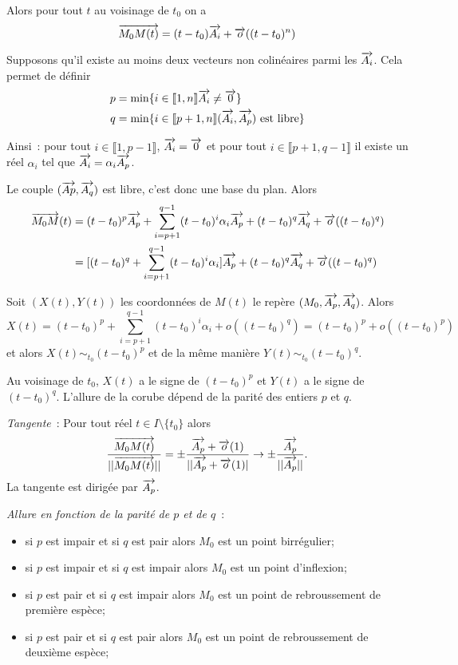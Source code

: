 Alors pour tout $t$ au voisinage de $t_0$ on a
\begin{equation}
  \overrightarrow{M_0M(t)} = (t-t_0)\overrightarrow{A_i} +\overrightarrow{o}((t-t_0)^n)
\end{equation}


Supposons qu'il existe au moins deux vecteurs non colinéaires parmi les $\overrightarrow{A_i}$. Cela permet de définir
\begin{align}
  p &= \min \{i \in \llbracket 1,n \rrbracket \overrightarrow{A_i} \neq \overrightarrow{0} \} \\
  q &= \min \{i \in \llbracket p+1,n \rrbracket (\overrightarrow{A_i},\overrightarrow{A_p}) \text{~est libre}\}
\end{align}

Ainsi~: pour tout $i \in \llbracket 1, p-1 \rrbracket$, $\overrightarrow{A_i}=\overrightarrow{0}$ et pour tout $i \in \llbracket p+1, q-1 \rrbracket$ il existe un réel $\alpha_i$ tel que $\overrightarrow{A_i}=\alpha_i \overrightarrow{A_p}$.

Le couple $(\overrightarrow{Ap}, \overrightarrow{A_q})$ est libre, c'est donc une base du plan. Alors
\begin{align}
  \overrightarrow{M_0M}(t) &= (t-t_0)^p \overrightarrow{A_p} + \sum_{i=p+1}^{q-1} (t-t_0)^i \alpha_i \overrightarrow{A_p} +(t-t_0)^q \overrightarrow{A_q} +\overrightarrow{o}((t-t_0)^q) \\
&=[(t-t_0)^q + \sum_{i=p+1}^{q-1} (t-t_0)^i \alpha_i]\overrightarrow{A_p} + (t-t_0)^q \overrightarrow{A_q} +\overrightarrow{o}((t-t_0)^q)
\end{align}

Soit $(X(t),Y(t))$ les coordonnées de $M(t)$ le repère $(M_0,\overrightarrow{A_p},\overrightarrow{A_q})$. Alors
\begin{equation}
  X(t) = (t-t_0)^p+\sum_{i=p+1}^{q-1} (t-t_0)^i \alpha_i + o((t-t_0)^q) = (t-t_0)^p + o((t-t_0)^p)
\end{equation}
et alors $X(t) \sim_{t_0} (t-t_0)^p$ et de la même manière $Y(t) \sim_{t_0}(t-t_0)^q$.

Au voisinage de $t_0$, $X(t)$ a le signe de $(t-t_0)^p$ et $Y(t)$ a le signe de $(t-t_0)^q$. L'allure de la corube dépend de la parité des entiers $p$ et $q$.

\emph{Tangente}~: Pour tout réel $t \in I\setminus\{t_0\}$ alors
\begin{equation}
  \frac{\overrightarrow{M_0M(t)}}{||\overrightarrow{M_0M(t)}||} = \pm \frac{\overrightarrow{A_p} +\overrightarrow{o}(1)}{||\overrightarrow{A_p} +\overrightarrow{o}(1)|} \to \pm \frac{\overrightarrow{A_p}}{||\overrightarrow{A_p}||}.
\end{equation}
La tangente est dirigée par $\overrightarrow{A_p}$.

\emph{Allure en fonction de la parité de $p$ et de $q$}~:
\begin{itemize}
\item si $p$ est impair et si $q$ est pair alors $M_0$ est un point birrégulier;
\item si $p$ est impair et si $q$ est impair alors $M_0$ est un point d'inflexion;
\item si $p$ est pair et si $q$ est impair alors $M_0$ est un point de rebroussement de première espèce;
\item si $p$ est pair et si $q$ est pair alors $M_0$ est un point de rebroussement de deuxième espèce;
\end{itemize}

